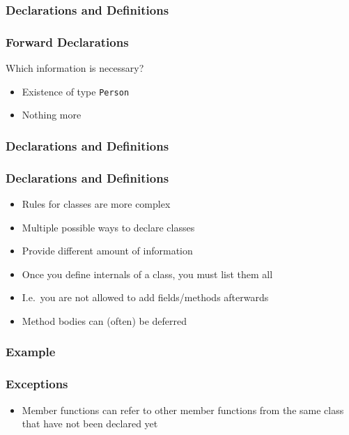 \documentclass{../ucll-slides}
\begin{document}
\begin{frame}
  \frametitle{Declarations and Definitions}
\end{frame}

\begin{frame}
  \frametitle{Forward Declarations}
  Which information is necessary?
  \begin{itemize}
    \item Existence of type {\tt Person}
    \item Nothing more
  \end{itemize}
\end{frame}

\begin{frame}
  \frametitle{Declarations and Definitions}
\end{frame}

\begin{frame}
  \frametitle{Declarations and Definitions}
  \begin{itemize}
    \item Rules for classes are more complex
    \item Multiple possible ways to declare classes
    \item Provide different amount of information
    \item Once you define internals of a class, you must list them all
    \item I.e.\ you are not allowed to add fields/methods afterwards
    \item Method bodies can (often) be deferred
  \end{itemize}
\end{frame}

\begin{frame}
  \frametitle{Example}
  \begin{overprint}
  \end{overprint}
\end{frame}

\begin{frame}
  \frametitle{Exceptions}
  \begin{itemize}
    \item Member functions can refer to other member functions
          from the same class that have not been declared yet
  \end{itemize}
\end{frame}
\end{document}
